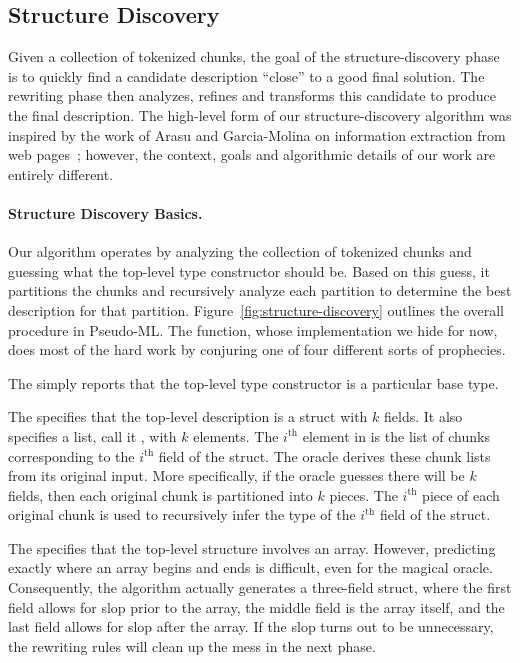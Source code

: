 \subsection {Structure Discovery}

Given a collection of tokenized chunks, the goal of the
structure-discovery phase is to quickly find a candidate description
``close'' to 
a good final solution.  The rewriting phase then analyzes, refines and
transforms this candidate to produce the final description.
The high-level form of our structure-discovery algorithm was
inspired by the work of Arasu and 
Garcia-Molina on information extraction from web pages~\cite{arasu+:sigmod03};
however, the context, goals and algorithmic details of our
work are entirely different.


\paragraph*{Structure Discovery Basics.}
Our algorithm operates by analyzing the collection of tokenized chunks
and guessing what the top-level type constructor should be.  Based on
this guess, it partitions the chunks and recursively analyze each partition
to determine the best description for that partition.
Figure~\ref{fig:structure-discovery} outlines the
overall procedure in Pseudo-ML.  The  function,
whose implementation we hide for now, does most of the hard work by
conjuring one of four different sorts of prophecies.  

The  simply reports that the top-level type
constructor is a particular base type.

The  specifies that the top-level description is a
struct with $k$ fields.  It also
specifies a list, call it , with $k$ elements.  The
$i^{\mathrm{th}}$ element in  is the list of chunks
corresponding to the $i^{\mathrm{th}}$ field of the struct.  The
oracle derives these chunk lists from its original input. More
specifically, if the oracle guesses there will be $k$ fields, then
each original chunk is partitioned into $k$ pieces. The
$i^{\mathrm{th}}$ piece of each original chunk is used to recursively
infer the type of the $i^{\mathrm{th}}$ field of the struct.

The  specifies that the top-level structure involves
an array.  However, predicting exactly where an array begins and ends
is difficult, even for the magical oracle.  Consequently, the
algorithm actually generates a three-field struct, where the first
field allows for slop prior to the array, the middle field is the
array itself, and the last field allows for slop after the array.  If
the slop turns out to be unnecessary, the rewriting rules will clean
up the mess in the next phase.

